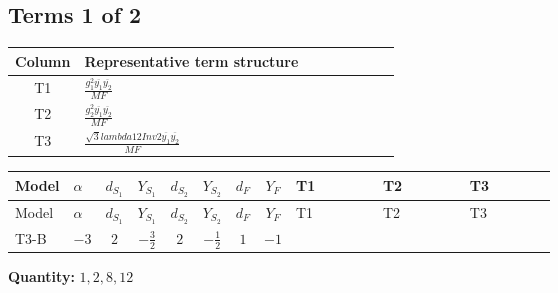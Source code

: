 \documentclass[8pt]{article}
\begin{document}
\begin{landscape}
\subsection*{Terms 1 of 2}
\begin{center}
\begin{tabular}{@{}c >{\raggedright\arraybackslash}p{0.82\linewidth}@{}}
\toprule
Column & Representative term structure \\
\midrule
T1 & \(\displaystyle \frac{g_{1}^{2} \overline{y_{1}} \overline{y_{2}}}{MF}\) \\
\midrule
T2 & \(\displaystyle \frac{g_{2}^{2} \overline{y_{1}} \overline{y_{2}}}{MF}\) \\
\midrule
T3 & \(\displaystyle \frac{\sqrt{3} lambda12Inv2 \overline{y_{1}} \overline{y_{2}}}{MF}\) \\
\midrule
\bottomrule
\end{tabular}
\end{center}
\smallskip
\tiny
\begin{longtable}{@{}llcccccc >{\raggedright\arraybackslash}p{0.21\linewidth} >{\raggedright\arraybackslash}p{0.21\linewidth} >{\raggedright\arraybackslash}p{0.21\linewidth}@{}}
\toprule
Model & $\alpha$ & $d_{S_1}$ & $Y_{S_1}$ & $d_{S_2}$ & $Y_{S_2}$ & $d_F$ & $Y_F$ & T1 & T2 & T3 \\
\midrule
\endfirsthead
\toprule
Model & $\alpha$ & $d_{S_1}$ & $Y_{S_1}$ & $d_{S_2}$ & $Y_{S_2}$ & $d_F$ & $Y_F$ & T1 & T2 & T3 \\
\midrule
\endhead
T3-B & $-3$ & $2$ & $-\frac{3}{2}$ & $2$ & $-\frac{1}{2}$ & $1$ & $-1$ & \scriptsize\adjustbox{max width=\linewidth}{$\begin{gathered} - \frac{3 g_{1}^{2} \overline{y_{1}} \overline{y_{2}}}{4 MF}\end{gathered}$} & \scriptsize\adjustbox{max width=\linewidth}{$\begin{gathered} - \frac{3 g_{2}^{2} \overline{y_{1}} \overline{y_{2}}}{8 MF}\end{gathered}$} & \scriptsize\adjustbox{max width=\linewidth}{$\begin{gathered} - \frac{\sqrt{3} lambda12Inv2 \overline{y_{1}} \overline{y_{2}}}{6 MF}\end{gathered}$} \\
\midrule
\bottomrule
\end{longtable}
\clearpage
\noindent\textbf{Quantity: }$\mathrm{1,2,8,12}$\par\smallskip

\end{landscape}
\end{document}
